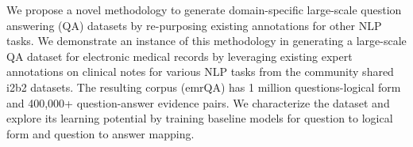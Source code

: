 We propose a novel methodology to generate domain-specific large-scale question answering (QA) datasets by re-purposing existing annotations for other NLP tasks. We demonstrate an instance of this methodology in generating a large-scale QA dataset for electronic medical records by leveraging existing expert annotations on clinical notes for various NLP tasks from the community shared i2b2 datasets. The resulting corpus (emrQA) has 1 million questions-logical form and 400,000+ question-answer evidence pairs. We characterize the dataset and explore its learning potential by training baseline models for question to logical form and question to answer mapping.

